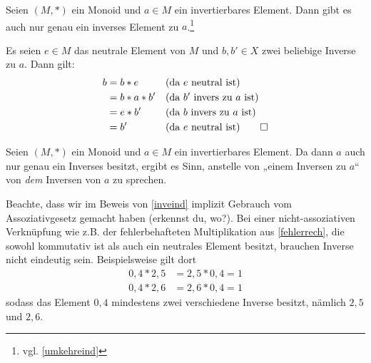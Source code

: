 \begin{sat} \label{inveind}
Seien $(M,*)$ ein Monoid und $a\in M$ ein invertierbares Element. Dann gibt es auch nur genau ein inverses Element zu $a$.\footnote{vgl. \cref{umkehreind}}
\end{sat}
\begin{bew}
 Es seien $e\in M$ das neutrale Element von $M$ und $b,b'\in X$ zwei beliebige Inverse zu $a$. Dann gilt:
 \begin{align*}
  b & = b*e && (\text{da $e$ neutral ist}) \\
  & = b* a*b' && (\text{da $b'$ invers zu $a$ ist}) \\
  & = e*b' && (\text{da $b$ invers zu $a$ ist}) \\
  & = b' && (\text{da $e$ neutral ist}) \qed
 \end{align*}
\end{bew}




\begin{bem}
  Seien $(M,*)$ ein Monoid und $a\in M$ ein invertierbares Element. Da dann $a$ auch nur genau ein Inverses besitzt, ergibt es Sinn, anstelle von „einem Inversen zu $a$“ von \emph{dem} Inversen von $a$ zu sprechen.
\end{bem}



\begin{bem}
 Beachte, dass wir im Beweis von \cref{inveind} implizit Gebrauch vom Assoziativgesetz gemacht haben (erkennst du, wo?). Bei einer nicht-assoziativen Verknüpfung wie z.B. der fehlerbehafteten Multiplikation aus \cref{fehlerrech}, die sowohl kommutativ ist als auch ein neutrales Element besitzt, brauchen Inverse nicht eindeutig sein. Beispielsweise gilt dort
 \begin{align*}
  0,4*2,5 & = 2,5*0,4 = 1 \\
  0,4 * 2,6 & = 2,6*0,4 = 1
 \end{align*}
sodass das Element $0,4$ mindestens zwei verschiedene Inverse besitzt, nämlich $2,5$ und $2,6$.
\end{bem}




